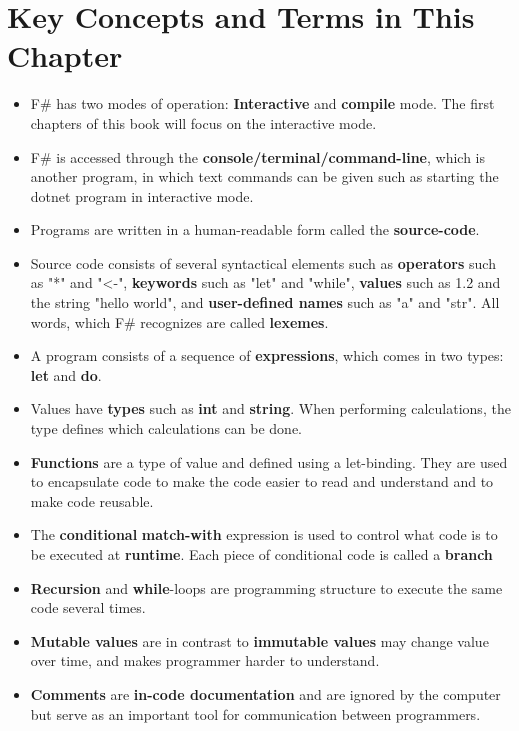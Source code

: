 \documentclass[fsharpNotes.tex]{subfiles}
\begin{document}
\section{Key Concepts and Terms in This Chapter}
\begin{itemize}
\item F\# has two modes of operation: \textbf{Interactive} and \textbf{compile} mode. The first chapters of this book will focus on the interactive mode. 
\item F\# is accessed through the \textbf{console/terminal/command-line}, which is another program, in which text commands can be given such as starting the dotnet program in interactive mode.
\item Programs are written in a human-readable form called the \textbf{source-code}.
\item Source code consists of several syntactical elements such as \textbf{operators} such as "*" and "<-", \textbf{keywords} such as "let" and "while", \textbf{values} such as 1.2 and the string "hello world", and \textbf{user-defined names} such as "a" and "str". All words, which F\# recognizes are called \textbf{lexemes}.
\item A program consists of a sequence of \textbf{expressions}, which comes in two types: \textbf{let} and \textbf{do}.
\item Values have \textbf{types} such as \textbf{int} and \textbf{string}. When performing calculations, the type defines which calculations can be done.
\item \textbf{Functions} are a type of value and defined using a let-binding. They are used to encapsulate code to make the code easier to read and understand and to make code reusable.
\item The \textbf{conditional} \textbf{match-with} expression is used to control what code is to be executed at \textbf{runtime}. Each piece of conditional code is called a \textbf{branch}
\item \textbf{Recursion} and \textbf{while}-loops are programming structure to execute the same code several times.
\item \textbf{Mutable values} are in contrast to \textbf{immutable values} may change value over time, and makes programmer harder to understand.
\item \textbf{Comments} are \textbf{in-code documentation} and are ignored by the computer but serve as an important tool for communication between programmers.
\end{itemize}
\end{document}
